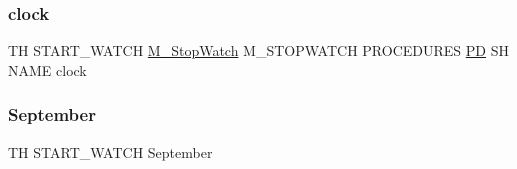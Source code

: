 \subsubsection{\texorpdfstring{clock}{clock}}
{\footnotesize\ttfamily TH S\+T\+A\+R\+T\+\_\+\+W\+A\+T\+CH \hyperlink{option__stopwatch_83_8txt_aa2011fc45a5e502e87ee50996a8a9305}{M\+\_\+\+Stop\+Watch} M\+\_\+\+S\+T\+O\+P\+W\+A\+T\+CH P\+R\+O\+C\+E\+D\+U\+R\+ES \hyperlink{what__overview_81_8txt_a85f26da5a4481fbdb0d9c79f2b94de3e}{PD} SH N\+A\+ME clock}

\mbox{\label{start__watch_83_8txt_aa28beaa3f308bdbe703fa8484f87082d}} 
\subsubsection{\texorpdfstring{September}{September}}
{\footnotesize\ttfamily TH S\+T\+A\+R\+T\+\_\+\+W\+A\+T\+CH September}

